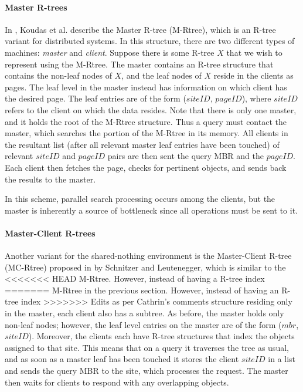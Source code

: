 \paragraph{Master R-trees}
In \cite{koudas1996declustering}, Koudas et al. describe the  Master R-tree 
(M-Rtree), which is an R-tree variant for distributed systems.
In this structure, there are two different types of machines: \emph{master} and 
\emph{client}. Suppose there is some R-tree $X$ that we wish to represent using 
the M-Rtree. The master contains an R-tree structure that contains the non-leaf 
nodes of $X$, and the leaf nodes of $X$ reside in the clients as pages. The leaf 
level in the master instead has information on which client has the desired page. 
The leaf entries are of the form ($siteID$, $pageID$), where $siteID$ refers to 
the client on which the data resides. Note that there is only one master, and 
it holds the root of the M-Rtree structure.
Thus a query must contact the master, which searches the portion of the M-Rtree 
in its memory. All clients in the resultant list (after all relevant master leaf 
entries have been touched) of relevant $siteID$ and $pageID$ pairs are then sent 
the query MBR and the $pageID$. Each client then fetches the page, checks for 
pertinent objects, and sends back the results to the master. 

In this scheme, parallel search processing occurs among the clients, but the 
master is inherently a source of bottleneck since all operations must be sent to
it.

\paragraph{Master-Client R-trees}
Another variant for the shared-nothing environment is the Master-Client R-tree 
(MC-Rtree) proposed in \cite{schnitzer1999master} by Schnitzer and Leutenegger,  
which is similar to the 
<<<<<<< HEAD
M-Rtree. However, instead of having a R-tree index 
=======
M-Rtree in the previous section. However, instead of having an R-tree index 
>>>>>>> Edits as per Cathrin's comments
structure residing only in the master, each client also has a subtree. As before,
the master holds only non-leaf nodes; however, the leaf level entries on the 
master are of the form ($mbr$, $\mathit{siteID}$). Moreover, the clients each have R-tree %
structures that index the objects assigned to that site. This means that on a 
query it traverses the tree as usual, and as soon as a master leaf has been 
touched it stores the client $\mathit{siteID}$ in a list and sends the query MBR to the 
site, which processes the request. The master then waits for clients to respond
with any overlapping objects. 

